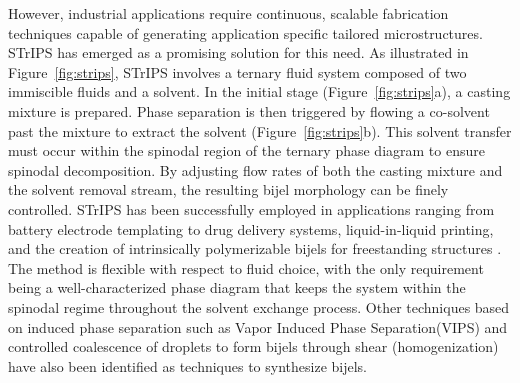 However, industrial applications require continuous, scalable fabrication techniques capable of generating application specific tailored microstructures. STrIPS has emerged as a promising solution 
for this need. As illustrated in Figure~\ref{fig:strips}, STrIPS involves a ternary fluid system composed of two immiscible fluids 
and a solvent. In the initial stage (Figure~\ref{fig:strips}a), a casting mixture is prepared. Phase separation is then triggered by flowing a co-solvent past the mixture to extract the solvent 
(Figure~\ref{fig:strips}b). This solvent transfer must occur within the spinodal region of the ternary phase diagram to ensure spinodal decomposition. By adjusting flow rates of both the casting 
mixture and the solvent removal stream, the resulting bijel morphology can be finely controlled. STrIPS has been successfully employed in applications ranging from battery electrode templating to drug 
delivery systems, liquid-in-liquid printing, and the creation of intrinsically polymerizable bijels for freestanding structures 
\cite{garcia_scalable_2019, thorson_bijel-templated_2019, amirfattahi_fabrication_2024, ching_rapid_2021}. The method is flexible with respect to fluid choice, with 
the only requirement being a well-characterized phase diagram that keeps the system within the spinodal regime throughout the solvent exchange process. Other techniques based on
induced phase separation such as Vapor Induced Phase Separation(VIPS) and controlled coalescence of droplets to form bijels through shear (homogenization) have also been identified as techniques
to synthesize bijels. \cite{wang_scalable_2020, huang_bicontinuous_2017}

